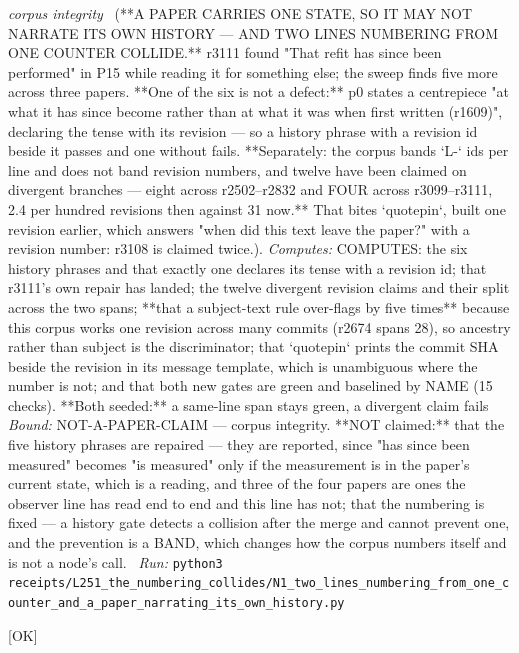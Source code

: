 \begin{description}
\textit{corpus integrity} \ (**A PAPER CARRIES ONE STATE, SO IT MAY NOT NARRATE ITS OWN HISTORY --- AND TWO LINES NUMBERING FROM ONE COUNTER COLLIDE.** r3111 found "That refit has since been performed" in P15 while reading it for something else; the sweep finds five more across three papers. **One of the six is not a defect:** p0 states a centrepiece "at what it has since become rather than at what it was when first written (r1609)", declaring the tense with its revision --- so a history phrase with a revision id beside it passes and one without fails. **Separately: the corpus bands `L-` ids per line and does not band revision numbers, and twelve have been claimed on divergent branches --- eight across r2502--r2832 and FOUR across r3099--r3111, 2.4 per hundred revisions then against 31 now.** That bites `quotepin`, built one revision earlier, which answers "when did this text leave the paper?" with a revision number: r3108 is claimed twice.). 
\emph{Computes:} COMPUTES: the six history phrases and that exactly one declares its tense with a revision id; that r3111's own repair has landed; the twelve divergent revision claims and their split across the two spans; **that a subject-text rule over-flags by five times** because this corpus works one revision across many commits (r2674 spans 28), so ancestry rather than subject is the discriminator; that `quotepin` prints the commit SHA beside the revision in its message template, which is unambiguous where the number is not; and that both new gates are green and baselined by NAME (15 checks). **Both seeded:** a same-line span stays green, a divergent claim fails
 \emph{Bound:} NOT-A-PAPER-CLAIM --- corpus integrity. **NOT claimed:** that the five history phrases are repaired --- they are reported, since "has since been measured" becomes "is measured" only if the measurement is in the paper's current state, which is a reading, and three of the four papers are ones the observer line has read end to end and this line has not; that the numbering is fixed --- a history gate detects a collision after the merge and cannot prevent one, and the prevention is a BAND, which changes how the corpus numbers itself and is not a node's call.
\ \emph{Run:} \texttt{python3 receipts/L251\_the\_numbering\_collides/N1\_two\_lines\_numbering\_from\_one\_counter\_and\_a\_paper\_narrating\_its\_own\_history.py}
\item[\label{rcpt:S1_a_seed_that_stops_constructing_its_defect_accuses_the_gate_it_defends}\texttt{S1\_a\_seed\_that\_stops\_constructing\_its\_defect\_accuses\_the\_gate\_it\_defends}]\hfill\textsf{[OK]}\\

\end{description}
